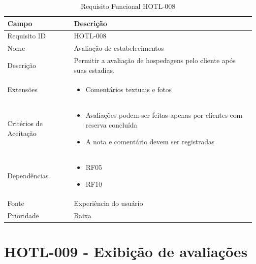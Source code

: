 \documentclass[
    12pt,
    oneside,
    a4paper,
    brazil
]{abntex2}
\begin{document}
\begin{table}[h]
	\begin{tabular}{|l|p{10cm}|}
		\hline
		\textbf{Campo} & \textbf{Descrição} \\
		\hline
		Requisito ID & HOTL-008 \\
		\hline
		Nome & Avaliação de estabelecimentos\\
		\hline
		Descrição & Permitir a avaliação de hospedagens pelo cliente após suas estadias. \\
		\hline
		Extensões & \begin{itemize}[leftmargin=*, labelsep=0.5em, noitemsep, topsep=0pt]
		\item Comentários textuais e fotos
		\end{itemize} \\
		\hline
		Critérios de Aceitação & \begin{itemize}[leftmargin=*, labelsep=0.5em, noitemsep, topsep=0pt]
		\item Avaliações podem ser feitas apenas por clientes com reserva concluída
		\item A nota e comentário devem ser registradas
		\end{itemize} \\
		\hline
		Dependências & \begin{itemize}[leftmargin=*, labelsep=0.5em, noitemsep, topsep=0pt] 
		\item RF05
		\item RF10
		\end{itemize} \\
		\hline
		Fonte & Experiência do usuário\\
		\hline
		Prioridade & Baixa \\
		\hline
	\end{tabular}
	\caption{Requisito Funcional HOTL-008}
\end{table}

\section{HOTL-009 - Exibição de avaliações}
\end{document}
